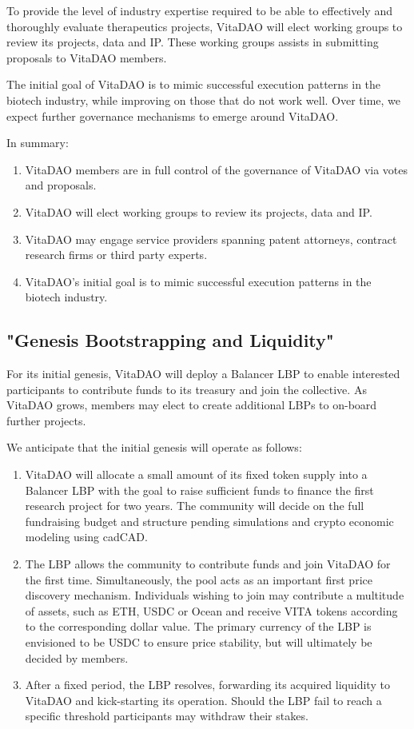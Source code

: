 \documentclass[12pt,letterpaper]{article}
\begin{document}
To provide the level of industry expertise required to be able to effectively and thoroughly evaluate therapeutics projects, VitaDAO will elect working groups to review its projects, data and IP. These working groups assists in submitting proposals to VitaDAO members.

The initial goal of VitaDAO is to mimic successful execution patterns in the biotech industry, while improving on those that do not work well. Over time, we expect further governance mechanisms to emerge around VitaDAO.

In summary:
\begin{enumerate}
\item VitaDAO members are in full control of the governance of VitaDAO via votes and proposals.
\item VitaDAO will elect working groups to review its projects, data and IP. 
\item VitaDAO may engage service providers spanning patent attorneys, contract research firms or third party experts.
\item VitaDAO’s initial goal is to mimic successful execution patterns in the biotech industry.
\end{enumerate}

\subsection{"Genesis Bootstrapping and Liquidity"}
For its initial genesis, VitaDAO will deploy a Balancer LBP to enable interested participants to contribute funds to its treasury and join the collective. As VitaDAO grows, members may elect to create additional LBPs to on-board further projects.

We anticipate that the initial genesis will operate as follows:
\begin{enumerate}
\item VitaDAO will allocate a small amount of its fixed token supply into a Balancer LBP with the goal to raise sufficient funds to finance the first research project for two years. The community will decide on the full fundraising budget and structure pending simulations and crypto economic modeling using cadCAD.
\item The LBP allows the community to contribute funds and join VitaDAO for the first time. Simultaneously, the pool acts as an important first price discovery mechanism. Individuals wishing to join may contribute a multitude of assets, such as ETH, USDC or Ocean and receive VITA tokens according to the corresponding dollar value. The primary currency of the LBP is envisioned to be USDC to ensure price stability, but will ultimately be decided by members.
\item After a fixed period, the LBP resolves, forwarding its acquired liquidity to VitaDAO and kick-starting its operation. Should the LBP fail to reach a specific threshold participants may withdraw their stakes.
\end{enumerate}
\end{document}
